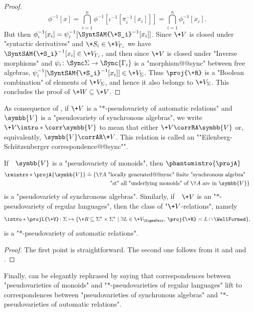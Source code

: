 \begin{proof}
	\[
		\phi^{-1}[x] = \bigcap_{i=1}^n \phi^{-1}[\iota^{-1}[\pi_i^{-1}[x_i]]]
		= \bigcap_{i=1}^n \phi_i^{-1}[x_i].
	\]
	But then $\phi_i^{-1}[x_i] = \psi_i^{-1}[\SyntSAM{\+S_i}^{-1}[x_i]]$.
	Since $\+V$ is closed under "syntactic derivatives" and $\+S_i \in \+V_{\Gamma_i}$
	we have $\SyntSAM{\+S_i}^{-1}[x_i] \in \+V_{\Gamma_i}$, and then since $\+V$ is closed under
	"Inverse morphisms" and $\psi_i\colon \Sync\Sigma \to \Sync{\Gamma_i}$ is a "morphism@@sync" between free algebras,
	$\psi_i^{-1}[\SyntSAM{\+S_i}^{-1}[x_i]] \in \+V_{\Sigma}$.
	Thus $\proj{\+R}$ is a "Boolean combination" of elements of $\+V_{\Sigma}$, and hence
	it also belongs to $\+V_{\Sigma}$. This concludes the proof of $\+W \subseteq \+V$.
\end{proof}

As consequence of , if
$\+V$ is a "$\ast$-pseudovariety of automatic relations"
and $\symbb{V}$ is a "pseudovariety of synchronous algebras",
we write \AP$\+V \intro*\corr \symbb{V}$
to mean that either $\+V \corrRA \symbb{V}$ or, equivalently, $\symbb{V} \corrAR \+V$.
This relation is called an \AP""Eilenberg-Schützenberger correspondence@@sync"".

\begin{proposition}
	If~~$\symbb{V}$ is a "pseudovariety of monoids", then \AP$\phantomintro{\projA}$
	\begin{align*}
		\reintro*\projA{\symbb{V}} & \defeq
		\{\?A \text{ "locally generated@@sync" finite "synchronous algebra"} \\
		& \qquad\qquad \text{ "st" all "underlying monoids" of $\?A$ are in $\symbb{V}$}\}
	\end{align*}
	is a "pseudovariety of synchronous algebras". Similarly,
	if~~$\+V$ is an "$\ast$-pseudovariety of regular languages", then
	the class of "$\+V$-relations", namely
	\[
		\intro*\projL{\+V} \colon
		\Sigma \mapsto \{\+R \subseteq \Sigma^* \times \Sigma^* \mid \exists L \in \+V_{\SigmaPair},\, \proj{\+R} = L \cap \WellFormed \},
	\]
	is a "$\ast$-pseudovariety of automatic relations".
\end{proposition}

\begin{proof}
	The first point is straightforward. The second one follows from it and and .
\end{proof}

\AP{}
Finally,  can be elegantly rephrased
by saying that correspondences between "pseudovarieties of monoids"
and "$\ast$-pseudovarieties of regular languages" lift to correspondences
between "pseudovarieties of synchronous algebras" and
"$\ast$-pseudovarieties of automatic relations".

